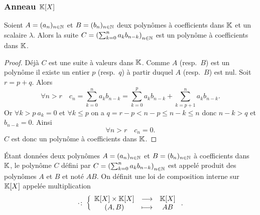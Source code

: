 \subsubsection{Anneau \(\mathbb{K}[X]\)}

\begin{lemme}
  Soient \(A = (a_n)_{n \in \mathbb{N}}\) et \(B = (b_n)_{n \in \mathbb{N}}\) deux polynômes à 
  coefficients dans \(\mathbb{K}\) et un scalaire \(\lambda\). Alors la suite \(C = 
  \left(\sum_{k = 0}^n a_kb_{n-k}\right)_{n \in \mathbb{N}}\) est un polynôme à 
  coefficients dans \(\mathbb{K}\).
\end{lemme}
\begin{proof}
  Déjà \(C\) est une suite à valeurs dans \(\mathbb{K}\). Comme \(A\) (resp.\ \(B\)) est 
  un polynôme il existe un entier \(p\) (resp.\ \(q\)) à partir duquel \(A\) 
  (resp.\ \(B\)) est nul. Soit \(r = p+q\). Alors
  \begin{equation}
    \forall n>r \quad c_n = \sum_{k = 0}^n a_kb_{n-k} = \sum_{k = 0}^p a_kb_{n-k} + 
    \sum_{k = p+1}^n a_kb_{n-k}.
  \end{equation}
  Or \(\forall k>p \ a_k = 0\) et \(\forall k \leqslant p\) on a \(q = r-p <n-p 
  \leqslant n-k \leqslant n\) donc \(n-k>q\) et \(b_{n-k} = 0\). Ainsi
  \begin{equation}
    \forall n>r \quad c_n = 0.
  \end{equation}
  \(C\) est donc un polynôme à coefficients dans \(\mathbb{K}\).
\end{proof}

\begin{defdef}
  Étant données deux polynômes \(A = (a_n)_{n \in \mathbb{N}}\) et \(B = (b_n)_{n \in \mathbb{N}}\) 
  à coefficients dans \(\mathbb{K}\), le polynôme \(C\) défini par \(C = 
  \left(\sum_{k = 0}^n a_kb_{n-k}\right)_{n \in \mathbb{N}}\) est appelé produit des 
  polynômes \(A\) et \(B\) et noté \(AB\). On définit une loi de composition 
  interne sur \(\mathbb{K}[X]\) appelée multiplication
  \begin{equation}
    \cdot\colon\left\{\begin{array}{ccc}\mathbb{K}[X]\times\mathbb{K}[X] & \longrightarrow &\mathbb{K}[X]\\(A,B) & \longmapsto & AB\end{array}\right..
  \end{equation}
\end{defdef}

